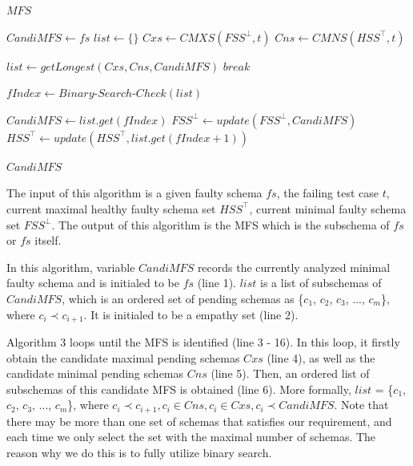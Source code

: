 \documentclass{sig-alternate-05-2015}
\begin{document}
{\begin{algorithm}[!htb]
\begin{algorithmic}[1]
  \Ensure  $MFS$ 

   \State $CandiMFS \leftarrow fs$
   \State $list \leftarrow \{\}$
        \State $Cxs \leftarrow CMXS(FSS^{\bot}, t) $
        \State $Cns \leftarrow CMNS(HSS^{\top}, t) $

        \State $list \leftarrow  getLongest(Cxs, Cns, CandiMFS)$
            \State $break$
         \EndIf

        \State $fIndex \leftarrow Binary$-$Search$-$Check(list)$

            \State $CandiMFS \leftarrow list.get(fIndex)$
             \State $FSS^{\bot} \leftarrow update(FSS^{\bot}, CandiMFS)$
        \EndIf
        \State $HSS^{\top} \leftarrow update(HSS^{\top}, list.get(fIndex+1))$

    \EndWhile
   \State \Return $CandiMFS$
  \end{algorithmic}
\end{algorithm}


The input of this algorithm is a given faulty schema $fs$,  the failing test case $t$, current maximal healthy faulty schema set $HSS^{\top}$, current minimal faulty schema set $FSS^{\bot}$. The output of this algorithm is the MFS which is the subschema of $fs$ or $fs$ itself.


In this algorithm, variable $CandiMFS$ records the currently analyzed minimal faulty schema and is initialed to be $fs$ (line 1). $list$ is a list of subschemas of $CandiMFS$, which is an ordered set of pending schemas as \{$c_{1}$, $c_{2}$, $c_{3}$, ..., $c_{m}$\}, where $c_{i} \prec c_{i+1}$. It is initialed to be a empathy set (line 2).

Algorithm 3 loops until the MFS is identified (line 3 - 16). In this loop, it firstly obtain the candidate maximal pending schemas $Cxs$ (line 4), as well as the candidate minimal pending schemas $Cns$ (line 5). Then, an ordered list of subschemas of this candidate MFS is obtained (line 6). More formally, $list$ = \{$c_{1}$, $c_{2}$, $c_{3}$, ..., $c_{m}$\}, where $c_{i} \prec c_{i+1},  c_{i} \in Cns, c_{i} \in Cxs, c_{i} \prec CandiMFS$. Note that there may be more than one set of schemas that satisfies our requirement, and each time we only select the set with the maximal number of schemas. The reason why we do this is to fully utilize binary search.

}
\end{document}
